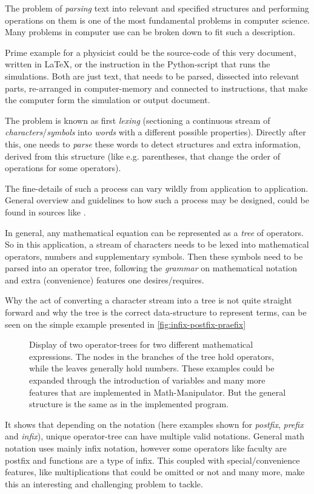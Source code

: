 The problem of \emph{parsing} text into relevant and specified structures and performing operations on them is one of the most fundamental problems in computer science. 
Many problems in computer use can be broken down to fit such a description.

Prime example for a physicist could be the source-code of this very document, written in \LaTeX, or the instruction in the Python-script that runs the simulations. 
Both are just text, that needs to be parsed, dissected into relevant parts, re-arranged in computer-memory and connected to instructions, that make the computer form the simulation or output document.

The problem is known as first \emph{lexing} (sectioning a continuous stream of \emph{characters}/\emph{symbols} into \emph{words} with a different possible properties).
Directly after this, one needs to \emph{parse} these words to detect structures and extra information, derived from this structure (like e.g. parentheses, that change the order of operations for some operators).

The fine-details of such a process can vary wildly from application to application. 
General overview and guidelines to how such a process may be designed, could be found in sources like \cite{compilersDragonBook}.

In general, any mathematical equation can be represented as a \emph{tree} of operators.
So in this application, a stream of characters needs to be lexed into mathematical operators, numbers and supplementary symbols.
Then these symbols need to be parsed into an operator tree, following the \emph{grammar} on mathematical notation and extra (convenience) features one desires/requires. 

Why the act of converting a character stream into a tree is not quite straight forward and why the tree is the correct data-structure to represent terms, can be seen on the simple example presented in \autoref{fig:infix-postfix-praefix}

\begin{figure}[htbp]
    \centering
            
    \vspace{0.8cm}
    \caption{Display of two operator-trees for two different mathematical expressions. 
    The nodes in the branches of the tree hold operators, while the leaves generally hold numbers. These examples could be expanded through the introduction of variables and many more features that are implemented in Math-Manipulator. But the general structure is the same as in the implemented program.}
    \label{fig:infix-postfix-praefix}
\end{figure}

It shows that depending on the notation (here examples shown for \emph{postfix}, \emph{prefix} and \emph{infix}), unique operator-tree can have multiple valid notations. 
General math notation uses mainly infix notation, however some operators like faculty are postfix and functions are a type of infix.
This coupled with special/convenience features, like multiplications that could be omitted or not and many more, make this an interesting and challenging problem to tackle.